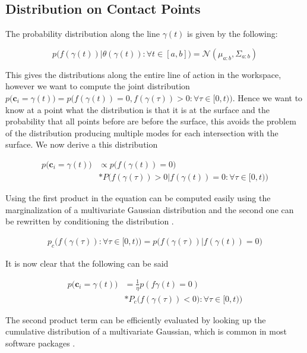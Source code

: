 \documentclass[letterpaper, 10 pt, conference]{ieeeconf}  %
\newcommand{\mN}{\mathcal{N}}
\begin{document}
\subsection{Distribution on Contact Points} The probability distribution along the line $\gamma(t)$ is given by the following:

\begin{equation}
p\big(f(\gamma(t))|\theta(\gamma(t)): \forall t \in [a,b] \big) 
=
\mN(\mu_{a:b},\Sigma_{a:b})
\end{equation}

This gives the distributions along the entire line of action in the workspace, however we want to compute the joint distribution   $p\big(\textbf{c}_i= \gamma(t)\big) = p\big(f(\gamma(t))=0, f(\gamma(\tau))> 0: \forall \tau \in [0,t)\big)$. Hence we want to know at a point what the distribution  is that it is at the surface and the probability that all points before are before the surface, this avoids the problem of the distribution producing multiple modes for each intersection with the surface. We now derive a  this distribution 

\begin{align*}
p\big(\textbf{c}_i = \gamma(t)\big) &\propto p\big(f(\gamma(t)) = 0\big)\\
               &*P\big(f(\gamma(\tau)) > 0 | f(\gamma(t)) = 0: \forall \tau \in [0,t)\big)
\end{align*}

Using the first product in the equation can be computed easily using the marginalization of a multivariate Gaussian distribution and the second one can be rewritten by conditioning the distribution \cite{petersen2008matrix}. 

\begin{align*}
p_c\big(f(\gamma(\tau)): \forall \tau \in [0,t)\big) = p\big(f(\gamma(\tau))  | f(\gamma(t)) = 0\big)  
\end{align*}


It is now clear that the following can be said

\begin{align*}
p\big(\textbf{c}_i = \gamma(t)\big) &= \frac{1}{\eta} p(f\gamma(t) = 0) \\
				   &*P_c\big(f(\gamma(\tau)) < 0): \forall \tau \in [0,t)\big)			 
\end{align*} 

The second product term can be efficiently evaluated by looking up the cumulative distribution of a multivariate Gaussian, which is common in most software packages \cite{matlab}.
\end{document}
